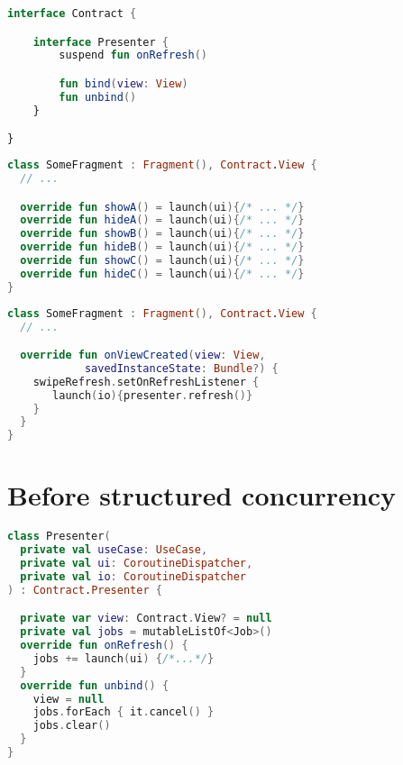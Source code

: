 \documentclass[10pt]{beamer}
\begin{document}
\begin{frame}[fragile]
\begin{lstlisting}[language=Kotlin, basicstyle=\ttfamily]
interface Contract {

    interface Presenter {
        suspend fun onRefresh()

        fun bind(view: View)
        fun unbind()
    }

}
\end{lstlisting}
\end{frame}
\begin{frame}[fragile]
\begin{lstlisting}[language=Kotlin, basicstyle=\ttfamily]
class SomeFragment : Fragment(), Contract.View {
  // ...

  override fun showA() = launch(ui){/* ... */}
  override fun hideA() = launch(ui){/* ... */}
  override fun showB() = launch(ui){/* ... */}
  override fun hideB() = launch(ui){/* ... */}
  override fun showC() = launch(ui){/* ... */}
  override fun hideC() = launch(ui){/* ... */}
}
\end{lstlisting}
\end{frame}

\begin{frame}[fragile]
\begin{lstlisting}[language=Kotlin, basicstyle=\ttfamily]
class SomeFragment : Fragment(), Contract.View {
  // ...

  override fun onViewCreated(view: View, 
            savedInstanceState: Bundle?) {
    swipeRefresh.setOnRefreshListener { 
       launch(io){presenter.refresh()}
    }
  }
}
\end{lstlisting}
\end{frame}


\section{Before structured concurrency}

\begin{frame}[fragile]
\begin{lstlisting}[language=Kotlin, basicstyle=\ttfamily]
class Presenter(
  private val useCase: UseCase,
  private val ui: CoroutineDispatcher,
  private val io: CoroutineDispatcher
) : Contract.Presenter {

  private var view: Contract.View? = null
  private val jobs = mutableListOf<Job>()
  override fun onRefresh() {
    jobs += launch(ui) {/*...*/}
  }
  override fun unbind() {
    view = null
    jobs.forEach { it.cancel() } 
    jobs.clear() 
  }
}
\end{lstlisting}
\end{frame}
\end{document}
